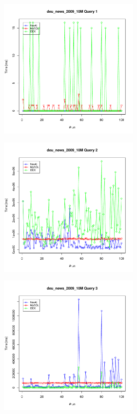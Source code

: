 \documentclass[11pt, a4paper, oneside]{article} %
\begin{document}
\begin{appendix}
\begin{landscape}
\begin{figure}[ht]
		\begin{minipage}[hbt]{6.5cm}
			\centering
			\includegraphics[width=7cm]{../results/cold caches/images/10M_query1_perf}
			\label{fig:10M_query1_perf}
		\end{minipage}
		\hfill
		\begin{minipage}[hbt]{6.5cm}
			\centering
			\includegraphics[width=7cm]{../results/cold caches/images/10M_query2_perf}
			\label{fig:10M_query2_perf}
		\end{minipage}
		\hfill
		\begin{minipage}[hbt]{6.5cm}
			\centering
			\includegraphics[width=7cm]{../results/cold caches/images/10M_query3_perf}
			\label{fig:10M_query3_perf}
		\end{minipage}
	\end{figure}
\end{landscape}

\end{appendix}
\end{document}
